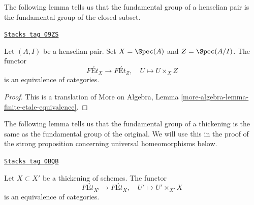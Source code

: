 The following lemma tells us that the fundamental group of a henselian
pair is the fundamental group of the closed subset.

\begin{lemma}[Gabber]
\label{pione-lemma-gabber}
\href{https://stacks.math.columbia.edu/tag/09ZS}{\texttt{Stacks tag 09ZS}}

Let $(A, I)$ be a henselian pair. Set $X = \Spec(A)$ and $Z = \Spec(A/I)$.
The functor
$$
\textit{F\'Et}_X \longrightarrow \textit{F\'Et}_Z,\quad
U \longmapsto U \times_X Z
$$
is an equivalence of categories.
\end{lemma}

\begin{proof}
This is a translation of
More on Algebra, Lemma \ref{more-algebra-lemma-finite-etale-equivalence}.
\end{proof}

The following lemma tells us that the fundamental group of a thickening
is the same as the fundamental group of the original. We will use this
in the proof of the strong proposition concerning universal homeomorphisms
below.

\begin{lemma}[Thickening]
\label{pione-lemma-thickening}
\href{https://stacks.math.columbia.edu/tag/0BQB}{\texttt{Stacks tag 0BQB}}

Let $X \subset X'$ be a thickening of schemes. The functor
$$
\textit{F\'Et}_{X'} \longrightarrow \textit{F\'Et}_X,\quad
U' \longmapsto U' \times_{X'} X
$$
is an equivalence of categories.
\end{lemma}

